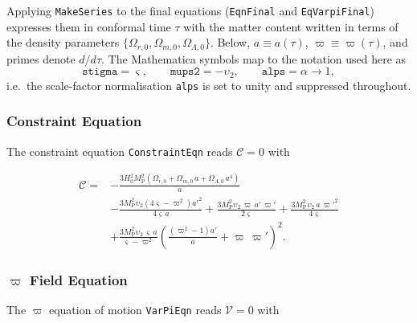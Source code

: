 \documentclass{article}
\newcommand{\Mp}{M_{\mathrm{P}}}
\begin{document}
Applying \texttt{MakeSeries} to the final equations (\texttt{EqnFinal} and \texttt{EqVarpiFinal}) expresses them in conformal time $\tau$ with the matter content written in terms of the density parameters $\{\Omega_{r,0}, \Omega_{m,0}, \Omega_{\Lambda,0}\}$. Below, $a \equiv a(\tau)$, $\varpi \equiv \varpi(\tau)$, and primes denote $d/d\tau$. The Mathematica symbols map to the notation used here as
\begin{equation}
\texttt{stigma} = \varsigma, \qquad
\texttt{mups2} = -\upsilon_2, \qquad
\texttt{alps} = \alpha \to 1,
\end{equation}
i.e.\ the scale-factor normalisation \texttt{alps} is set to unity and suppressed throughout.

\subsubsection{Constraint Equation}

The constraint equation \texttt{ConstraintEqn} reads $\mathcal{C} = 0$ with

\begin{equation}
\begin{aligned}
\mathcal{C} = {}& -\frac{3 H_0^2 \Mp^2 \left(\Omega_{r,0} + \Omega_{m,0}\, a + \Omega_{\Lambda,0}\, a^4\right)}{a} \\
&- \frac{3 \Mp^2 \upsilon_2 \left(4 \varsigma - \varpi^2\right) a'^2}{4 \varsigma\, a}
+ \frac{3 \Mp^2 \upsilon_2\, \varpi\, a'\, \varpi'}{2 \varsigma}
+ \frac{3 \Mp^2 \upsilon_2\, a\, \varpi'^2}{4 \varsigma} \\
&+ \frac{3 \Mp^2 \upsilon_2\, \varsigma\, a}{\varsigma - \varpi^2}
   \left(\frac{\left(\varpi^2 - 1\right) a'}{a} + \varpi\, \varpi'\right)^2 .
\end{aligned}
\end{equation}

\subsubsection{$\varpi$ Field Equation}

The $\varpi$ equation of motion \texttt{VarPiEqn} reads $\mathcal{V} = 0$ with
\end{document}
